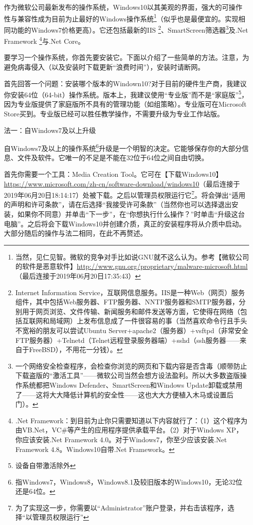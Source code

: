 \documentclass{book}
\begin{document}
\begin{window}
作为微软公司最新发布的操作系统，Windows10以其美观的界面，强大的可操作性与兼容性成为目前为止最好的Windows操作系统\footnote{当然，见仁见智。微软的竞争对手比如说GNU就不这么认为。参考【微软公司的软件是恶意软件】\url{http://www.gnu.org/proprietary/malware-microsoft.html}（最后连接于2019年06月20日17:35:43）}（似乎也是最便宜的。实现相同功能的Windows7价格更高）。它还包括最新的IIS \footnote{Internet Information Service，互联网信息服务。IIS是一种Web（网页）服务组件，其中包括Web服务器、FTP服务器、NNTP服务器和SMTP服务器，分别用于网页浏览、文件传输、新闻服务和邮件发送等方面，它使得在网络（包括互联网和局域网）上发布信息成了一件很容易的事（当然喜欢命令行且手头不宽裕的朋友可以尝试Ubuntu Server+apache2（服务器）+vsftpd（非常安全FTP服务器）+Telnetd（Telnet远程登录服务器端）+sshd（ssh服务器——来自于FreeBSD），不用花一分钱）。\cite{iisinfo}}、SmartScreen筛选器\footnote{一个网络安全检查程序，会检查你浏览的网页和下载内容是否含毒（顺带防止下载盗版的“激活工具”——微软公司当然会想方设法盈利。所以大多数盗版操作系统都把Windows Defender、SmartScreen和Windows Update卸载或禁用了——这将大大降低计算机的安全性——这也大大方便植入木马或设置后门）。}及.Net Framework \footnote{.Net Framework：到目前为止你只需要知道以下内容就行了：（1）这个程序为由VB.Net，VC\#等产生的应用程序提供承载平台。（2）对于Windows XP，你应该安装.Net Framework 4.0。对于Windows7，你至少应该安装.Net Framework 4.8。Windows10自带.Net Framework。}与.Net Core。\par
要学习一个操作系统，你首先要安装它。下面以介绍了一些简单的方法。注意，为避免病毒侵入（以及安装时下载更新“浪费时间”），安装时请断网。\par
首先回答一个问题：安装哪个版本的Windown10?对于目前的硬件生产商，我建议你安装64位（64-bit）操作系统。版本上，我建议使用“专业版”而不是“家庭版”\footnote{设备自带激活除外}，因为专业版提供了家庭版所不具有的管理功能（如组策略）。专业版可在Microsoft Store买到。专业版已经可以胜任教学操作，不需要升级为专业工作站版。\par
\end{window}
法一：自Windows7及以上升级\par
自Windows7及以上的操作系统\footnote{指Windows7，Windows8，Windows8.1及较旧版本的Windows10，无论32位还是64位。}升级是一个明智的决定。它能够保存你的大部分信息、文件及软件。它唯一的不足是不能在32位于64位之间自由切换。\par
首先你需要一个工具：Media Creation Tool。它可在【下载Windows10】\url{https://www.microsoft.com/zh-cn/software-download/windows10}（最后连接于2019年06月20日18:14:17）处被下载。之后以管理员权限运行它\footnote{为了实现这一步，你需要以“Administrator”账户登录，并右击该程序，选择“以管理员权限运行”}。将会弹出“适用的声明和许可条款”，请在{\color{red}{仔细阅读}}后选择“我接受许可条款”（当然你也可以选择退出安装，如果你不同意）并单击“下一步”，在“你想执行什么操作？”时单击“升级这台电脑”。之后将会下载Windows10并创建介质，真正的安装程序将从介质中启动。大部分随后的操作与法二相同，在此不再赘述。\par
\end{document}
